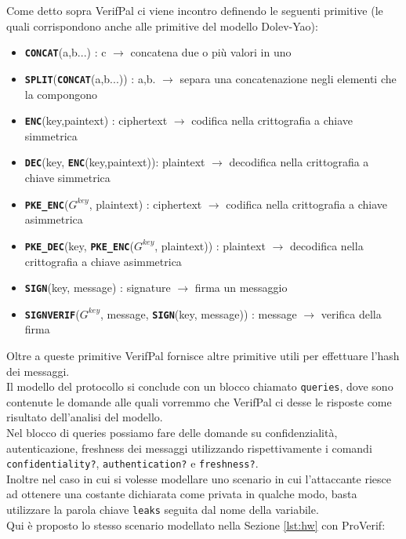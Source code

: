 Come detto sopra VerifPal ci viene incontro definendo le seguenti primitive (le quali corrispondono anche alle primitive del modello Dolev-Yao): 
\begin{itemize}
    \item \textbf{\texttt{CONCAT}}(a,b...) : c $\rightarrow$ concatena due o più valori in uno
    \item \textbf{\texttt{SPLIT}}(\textbf{\texttt{CONCAT}}(a,b...)) : a,b. $\rightarrow$ separa una concatenazione negli elementi che la compongono
    \item \textbf{\texttt{ENC}}(key,paintext) : ciphertext $\rightarrow$ codifica nella crittografia a chiave simmetrica
    \item \textbf{\texttt{DEC}}(key, \textbf{\texttt{ENC}}(key,paintext)): plaintext $\rightarrow$ decodifica nella crittografia a chiave simmetrica
    \item \textbf{\texttt{PKE\_ENC}}($G^{key}$, plaintext) : ciphertext $\rightarrow$ codifica nella crittografia a chiave asimmetrica
    \item \textbf{\texttt{PKE\_DEC}}(key, \textbf{\texttt{PKE\_ENC}}($G^{key}$, plaintext)) : plaintext $\rightarrow$ decodifica nella crittografia a chiave asimmetrica
    \item \textbf{\texttt{SIGN}}(key, message) : signature $\rightarrow$ firma un messaggio
    \item \textbf{\texttt{SIGNVERIF}}($G^{key}$, message, \textbf{\texttt{SIGN}}(key, message)) : message $\rightarrow$ verifica della firma
\end{itemize}

\noindent Oltre a queste primitive VerifPal fornisce altre primitive utili per effettuare l'hash dei messaggi.\\
Il modello del protocollo si conclude con un blocco chiamato \texttt{queries}, dove sono contenute le domande alle quali vorremmo che VerifPal ci desse le risposte come risultato dell'analisi del modello.\\
Nel blocco di queries possiamo fare delle domande su confidenzialità, autenticazione, freshness dei messaggi utilizzando rispettivamente i comandi \texttt{confidentiality?}, \texttt{authentication?} e \texttt{freshness?}.\\
Inoltre nel caso in cui si volesse modellare uno scenario in cui l'attaccante riesce ad ottenere una costante dichiarata come privata in qualche modo, basta utilizzare la parola chiave \texttt{leaks} seguita dal nome della variabile.\\
Qui è proposto lo stesso scenario modellato nella Sezione \ref{lst:hw} con ProVerif:

